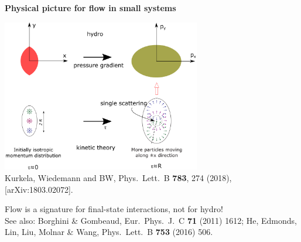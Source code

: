 \documentclass[9pt,a4paper,unknownkeysallowed,xcolor=dvipsnames,aspectratio=43]{beamer}
\begin{document}
\begin{frame}{\bf\huge Physical picture for flow in small systems}
\vspace{4mm}
\begin{center}
\includegraphics[width=0.65\textwidth]{fig/onehit}\\
{\tiny  {\color{teablue} Kurkela, Wiedemann and BW,
  Phys.\ Lett.\ B {\bf 783}, 274 (2018), [arXiv:1803.02072].
  }
  }
\end{center}
\vspace{4mm}
{{\LARGE\color{darkred} Flow is a signature for final-state interactions, not for hydro!}}
\vspace{2mm}\\
{\tiny  See also: {\color{teablue}   Borghini \& Gombeaud,
  Eur.\ Phys.\ J.\ C {\bf 71} (2011) 1612; He, Edmonds, Lin, Liu, Molnar \& Wang,
  Phys.\ Lett.\ B {\bf 753} (2016) 506.
  }
}
\end{frame}
\end{document}
